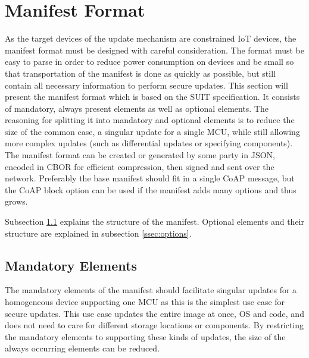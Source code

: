 \documentclass[0-thesis.tex]{subfiles}
\begin{document}

\section{Manifest Format}
\label{sec:manifest-format}
As the target devices of the update mechanism are constrained IoT devices, the manifest
format must be designed with careful consideration. The format must be easy to parse in
order to reduce power consumption on devices and be small so that transportation of the
manifest is done as quickly as possible, but still contain all necessary information to
perform secure updates. This section will present the manifest format which is based on
the SUIT specification. It consists of mandatory, always present elements as well as
optional elements. The reasoning for splitting it into mandatory and optional elements is
to reduce the size of the common case, a singular update for a single MCU, while still
allowing more complex updates (such as differential updates or specifying components). The
manifest format can be created or generated by some party in JSON, encoded in CBOR for
efficient compression, then signed and sent over the network. Preferably the base manifest
should fit in a single CoAP message, but the CoAP block option can be used if the manifest
adds many options and thus grows.

Subsection \ref{ssec:mandatory-elements} explains the structure of the manifest. Optional
elements and their structure are explained in subsection \ref{ssec:options}. 

\subsection{Mandatory Elements}
\label{ssec:mandatory-elements}
The mandatory elements of the manifest should facilitate singular updates for a homogeneous
device supporting one MCU as this is the simplest use case for secure updates. This use
case updates the entire image at once, OS and code, and does not need to care for
different storage locations or components. By restricting the mandatory elements to
supporting these kinds of updates, the size of the always occurring elements can be
reduced. 
\end{document}
